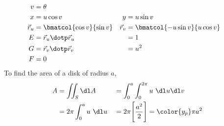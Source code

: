 \begin{enumerate}
\begin{enumerate}
\begin{align}
                        v         & = \theta                          \\
                        x         & = u\cos v                       &
                        y         & = u\sin v                         \\
                        \vec{r}_u & = \bmatcol{\cos v}{\sin v}      &
                        \vec{r}_v & = \bmatcol{-u \sin v}{u \cos v}   \\
                        E         & = \vec{r}_u \dotp \vec{r}_u     &
                                  & = 1                               \\
                        G         & = \vec{r}_v \dotp \vec{r}_v     &
                                  & = u^2                             \\
                        F         & = 0
                    \end{align}
                    To find the area of a disk of radius $ a $,
                    \begin{align}
                        A & = \iint_S \dl A                                        &
                          & = \int_{0}^{a}\int_{0}^{2\pi} u\ \dl u \dl v             \\
                          & = 2\pi \int_{0}^{a} u\ \dl u                           &
                          & = 2\pi \Bigg[\frac{a^2}{2}\Bigg] = \color{y_p} \pi a^2
                    \end{align}


\end{enumerate}
\end{enumerate}
